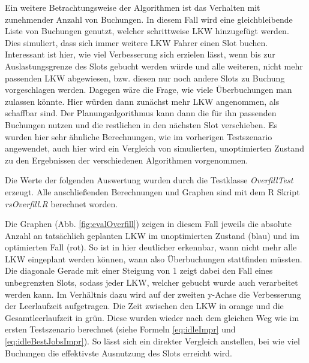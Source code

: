 Ein weitere Betrachtungsweise der Algorithmen ist das Verhalten mit zunehmender Anzahl von Buchungen. In diesem Fall wird eine gleichbleibende Liste von Buchungen genutzt, welcher schrittweise LKW hinzugefügt werden. Dies simuliert, dass sich immer weitere LKW Fahrer einen Slot buchen. Interessant ist hier, wie viel Verbesserung sich erzielen lässt, wenn bis zur Auslastungsgrenze des Slots gebucht werden würde und alle weiteren, nicht mehr passenden LKW abgewiesen, bzw. diesen nur noch andere Slots zu Buchung vorgeschlagen werden. Dagegen wäre die Frage, wie viele Überbuchungen man zulassen könnte. Hier würden dann zunächst mehr LKW angenommen, als schaffbar sind. Der Planungsalgorithmus kann dann die für ihn passenden Buchungen nutzen und die restlichen in den nächsten Slot verschieben. Es wurden hier sehr ähnliche Berechnungen, wie im vorherigen Testszenario angewendet, auch hier wird ein Vergleich von simulierten, unoptimierten Zustand zu den Ergebnissen der verschiedenen Algorithmen vorgenommen.

Die Werte der folgenden Auswertung wurden durch die Testklasse \textit{OverfillTest} erzeugt. Alle anschließenden Berechnungen und Graphen sind mit dem R Skript \textit{rsOverfill.R} berechnet worden.

Die Graphen (Abb. \ref{fig:evalOverfill}) zeigen in diesem Fall jeweils die absolute Anzahl an tatsächlich geplanten LKW im unoptimierten Zustand (blau) und im optimierten Fall (rot). So ist in hier deutlicher erkennbar, wann nicht mehr alle LKW eingeplant werden können, wann also Überbuchungen stattfinden müssten. Die diagonale Gerade mit einer Steigung von 1 zeigt dabei den Fall eines unbegrenzten Slots, sodass jeder LKW, welcher gebucht wurde auch verarbeitet werden kann. Im Verhältnis dazu wird auf der zweiten y-Achse die Verbesserung der Leerlaufzeit aufgetragen. Die Zeit zwischen den LKW in orange und die Gesamtleerlaufzeit in grün. Diese wurden wieder nach dem gleichen Weg wie im ersten Testszenario berechnet (siehe Formeln \ref{eq:idleImpr} und \ref{eq:idleBestJobsImpr}). So lässt sich ein direkter Vergleich anstellen, bei wie viel Buchungen die effektivste Ausnutzung des Slots erreicht wird.


